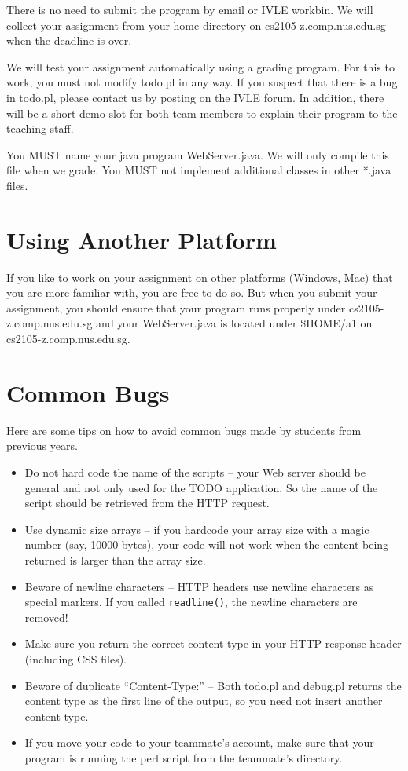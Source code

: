 \documentclass[a4paper,11pt]{exam}
\begin{document}
There is no need to submit the program by email or IVLE workbin. We will collect your assignment from your home directory on cs2105-z.comp.nus.edu.sg when the deadline is over.

We will test your assignment automatically using a grading program. For this to work, you must not modify todo.pl in any way. If you suspect that there is a bug in todo.pl, please contact us by posting on the IVLE forum.  In addition, there will be a short demo slot for both team members to explain their program to the teaching staff. 

You MUST name your java program WebServer.java. We will only compile this file when we grade. You MUST not implement additional classes in other *.java files.

\section*{Using Another Platform}

If you like to work on your assignment on other platforms (Windows, Mac) that you are more familiar with, you are free to do so. But when you submit your assignment, you should ensure that your program runs properly under cs2105-z.comp.nus.edu.sg and your WebServer.java is located under \$HOME/a1 on cs2105-z.comp.nus.edu.sg.

\section*{Common Bugs}

Here are some tips on how to avoid common bugs made by students from previous years.
\begin{itemize}
		\item Do not hard code the name of the scripts -- your Web server should be general and not only used for the TODO application.  So the name of the script should be retrieved from the HTTP request.
		\item Use dynamic size arrays -- if you hardcode your array size with a magic number (say, 10000 bytes), your code will not work when the content being returned is larger than the array size.
		\item Beware of newline characters -- HTTP headers use newline characters as special markers.  If you called \texttt{readline()}, the newline characters are removed!
		\item Make sure you return the correct content type in your HTTP response header (including CSS files).
		\item Beware of duplicate ``Content-Type:'' -- Both todo.pl and debug.pl returns the content type as the first line of the output, so you need not insert another content type.
		\item If you move your code to your teammate's account, make sure that your program is running the perl script from the teammate's directory.
\end{itemize}
\end{document}
